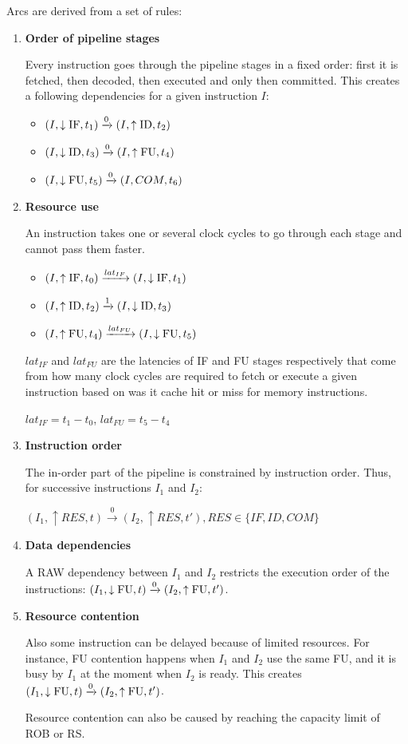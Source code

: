 Arcs are derived from a set of rules:
\begin{enumerate}
    \item \textbf{Order of pipeline stages}
    
    Every instruction goes through the pipeline stages in a fixed order: first it is fetched, then decoded, then executed and only then committed. This creates a following dependencies for a given instruction $I$:

    \begin{itemize}
        \item $(I, \downarrow\mathrm{IF}, t_1) \xrightarrow{0} (I, \uparrow\mathrm{ID}, t_2)$
        \item $(I, \downarrow\mathrm{ID}, t_3) \xrightarrow{0} (I, \uparrow\mathrm{FU}, t_4)$
        \item $(I, \downarrow\mathrm{FU}, t_5)  \xrightarrow{0} (I, COM, t_6)$
    \end{itemize}

    \item \textbf{Resource use}

    An instruction takes one or several clock cycles to go through each stage and cannot pass them faster.

    \begin{itemize}
        \item $(I, \uparrow\mathrm{IF}, t_0) \xrightarrow{lat_{IF}} (I, \downarrow\mathrm{IF}, t_1)$
        \item $(I, \uparrow\mathrm{ID}, t_2) \xrightarrow{1} (I, \downarrow\mathrm{ID}, t_3)$
        \item $(I, \uparrow\mathrm{FU}, t_4)  \xrightarrow{lat_{FU}} (I, \downarrow\mathrm{FU}, t_5)$
    \end{itemize}

    $lat_{IF}$ and $lat_{FU}$ are the latencies of IF and FU stages respectively that come from how many clock cycles are required to fetch or execute a given instruction based on was it cache hit or miss for memory instructions.

    $lat_{IF} = t_1 - t_0$, $lat_{FU} = t_5 - t_4$

    \item \textbf{Instruction order}
    
    The in-order part of the pipeline is constrained by instruction order. Thus, for successive instructions $I_1$ and $I_2$:

    $(I_1,  \uparrow RES, t) \xrightarrow{0} (I_2, \uparrow RES, t'), RES \in \{IF, ID, COM\}$


    \item \textbf{Data dependencies}
    
    A RAW dependency between $I_1$ and $I_2$ restricts the execution order of the instructions:  $(I_1, \downarrow\mathrm{FU}, t) \xrightarrow{0} (I_2, \uparrow\mathrm{FU}, t')$.
    
    \item \textbf{Resource contention}
    
    Also some instruction can be delayed because of limited resources. For instance, FU contention happens when $I_1$ and $I_2$ use the same FU, and it is busy by $I_1$ at the moment when $I_2$ is ready. This creates $(I_1, \downarrow\mathrm{FU}, t) \xrightarrow{0} (I_2, \uparrow\mathrm{FU}, t')$. 

    Resource contention can also be caused by reaching the capacity limit of ROB or RS. 
\end{enumerate}
